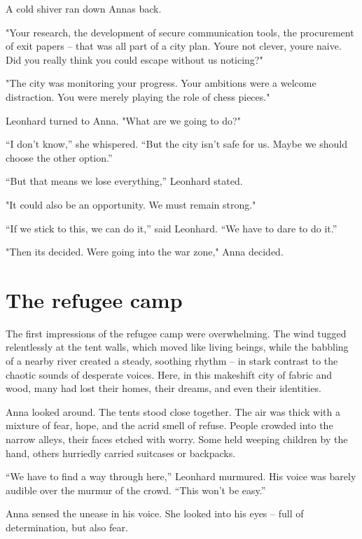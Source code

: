 \documentclass[
]{article}
\begin{document}
A cold shiver ran down Anna\textquotesingle s back.

"Your research, the development of secure communication tools, the procurement of exit papers -- that was all part of a city plan. You\textquotesingle re not clever, you\textquotesingle re naive. Did you really think you could escape without us noticing?"

"The city was monitoring your progress. Your ambitions were a welcome distraction. You were merely playing the role of chess pieces."

Leonhard turned to Anna. "What are we going to do?"

``I don't know,'' she whispered. ``But the city isn't safe for us. Maybe we should choose the other option.''

``But that means we lose everything,'' Leonhard stated.

"It could also be an opportunity. We must remain strong."

``If we stick to this, we can do it,'' said Leonhard. ``We have to dare to do it.''

"Then it\textquotesingle s decided. We\textquotesingle re going into the war zone," Anna decided.

\section{The refugee camp}\label{the-refugee-camp}

The first impressions of the refugee camp were overwhelming. The wind tugged relentlessly at the tent walls, which moved like living beings, while the babbling of a nearby river created a steady, soothing rhythm -- in stark contrast to the chaotic sounds of desperate voices. Here, in this makeshift city of fabric and wood, many had lost their homes, their dreams, and even their identities.

Anna looked around. The tents stood close together. The air was thick with a mixture of fear, hope, and the acrid smell of refuse. People crowded into the narrow alleys, their faces etched with worry. Some held weeping children by the hand, others hurriedly carried suitcases or backpacks.

``We have to find a way through here,'' Leonhard murmured. His voice was barely audible over the murmur of the crowd. ``This won't be easy.''

Anna sensed the unease in his voice. She looked into his eyes -- full of determination, but also fear.
\end{document}
